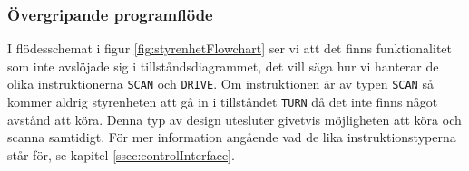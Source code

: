 \documentclass[a4paper,11pt]{article}
\begin{document}
\clearpage

\subsubsection{Övergripande programflöde}
I flödesschemat i figur \ref{fig:styrenhetFlowchart} ser vi att det finns funktionalitet som inte avslöjade sig i tillståndsdiagrammet, det vill säga hur vi hanterar de olika instruktionerna \texttt{SCAN} och \texttt{DRIVE}. Om instruktionen är av typen \texttt{SCAN} så kommer aldrig styrenheten att gå in i tillståndet \texttt{TURN} då det inte finns något avstånd att köra. Denna typ av design utesluter givetvis möjligheten att köra och scanna samtidigt. För mer information angående vad de lika instruktionstyperna står för, se kapitel \ref{ssec:controlInterface}. 
\end{document}

